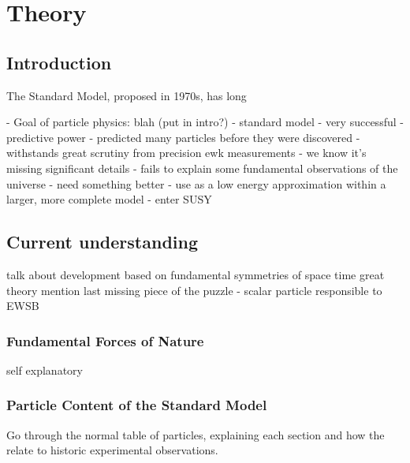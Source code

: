 
\chapter{Theory}
\label{ch:2}

\ifpdf
    \graphicspath{{Chapter2/Figs/Raster/}{Chapter2/Figs/PDF/}{Chapter2/Figs/}}
\else
    \graphicspath{{Chapter2/Figs/Vector/}{Chapter2/Figs/}}
\fi


\section{Introduction}  %
\label{sec:theory_intro}

The Standard Model, proposed in 1970s, has long 

- Goal of particle physics: blah (put in intro?)
- standard model
- very successful
    - predictive power - predicted many particles before they were discovered
    - withstands great scrutiny from precision ewk measurements
- we know it's missing significant details
- fails to explain some fundamental observations of the universe
- need something better
    - use as a low energy approximation within a larger, more complete model
    - enter SUSY

\section{Current understanding}
\label{sec:theory_current}
talk about development
based on fundamental symmetries of space time
great theory
mention last missing piece of the puzzle - scalar particle responsible to EWSB

\subsection{Fundamental Forces of Nature}
self explanatory

\subsection{Particle Content of the Standard Model}
Go through the normal table of particles, explaining each section and how the relate 
to historic experimental observations.

